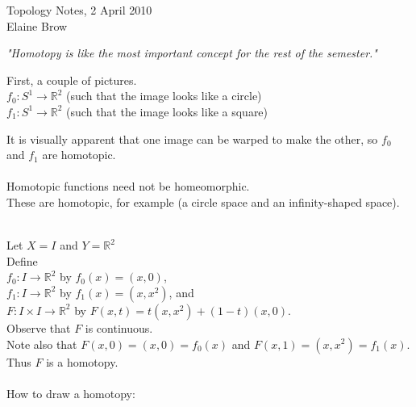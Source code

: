 \documentclass[10pt,reqno]{amsart}
\begin{document}
\begin{center}
\huge Topology Notes, 2 April 2010 \\
\normalsize
Elaine Brow
\end{center}
\vspace{.1in}
\begin{center}
{\it "Homotopy is like the most important concept for the rest of the semester."}
\end{center}
\vspace{.1in}
First, a couple of  pictures.\\
$f_0: S^1 \rightarrow \mathbb{R}^2$ (such that the image looks like a circle)\\
$f_1: S^1 \rightarrow \mathbb{R}^2$ (such that the image looks like a square)\\
\vspace{1in}

\noindent It is visually apparent that one image can be warped to make the other, so $f_0$ and $f_1$ are homotopic.\\\\
Homotopic functions need not be homeomorphic.\\
These  are homotopic, for example (a circle space and an infinity-shaped space).\\
\vspace{1in}

\\
Let $X = I$ and $Y = \mathbb{R}^2$\\
Define\\
$f_0: I \rightarrow \mathbb{R}^2$ by $f_0(x) = (x,0)$,\\
$f_1: I \rightarrow \mathbb{R}^2$ by $f_1(x) = (x,x^2)$, and\\
$F: I \times I \rightarrow \mathbb{R}^2$ by $F(x, t) = t(x, x^2) + (1-t)(x, 0)$.\\
Observe that $F$ is continuous.\\
Note also that $F(x,0) = (x, 0) = f_0(x)$ and $F(x,1) = (x, x^2) = f_1(x)$.\\
Thus $F$ is a homotopy.\\\\
How to draw a homotopy:\\
\vspace{1in}
\end{document}
